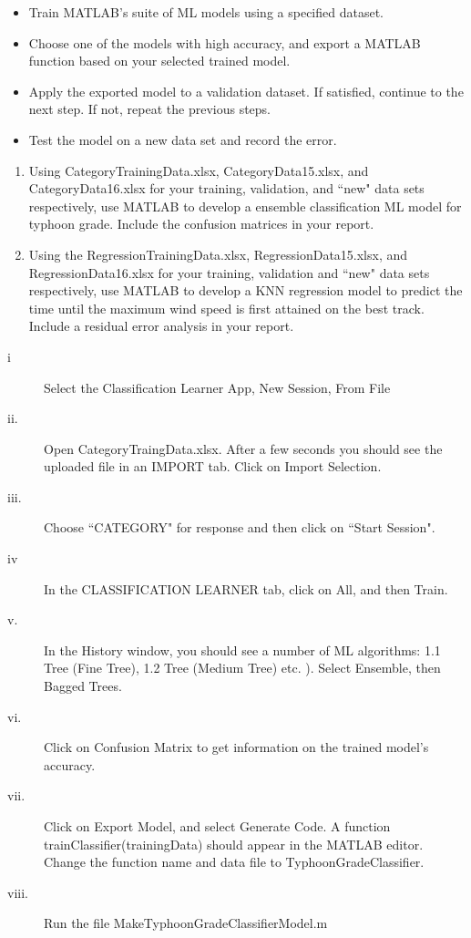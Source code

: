 \documentclass{SBCbookchapter}
\begin{document}
	\begin{itemize}
		\item Train MATLAB's suite of ML models using a specified dataset.
		\item Choose one of the models with high accuracy, and export a MATLAB function based on your selected trained model.
		\item Apply the exported model to a validation dataset.
		If satisfied, continue to the next step. If not, repeat the previous steps.
		\item Test the model on a new data set and record the error. 
	\end{itemize} 
	
	\begin{enumerate}
		\item Using CategoryTrainingData.xlsx,  CategoryData15.xlsx, and CategoryData16.xlsx for your training, validation, and ``new" data sets respectively, use MATLAB to develop a ensemble classification ML model for typhoon grade. Include the confusion matrices in your report. 
		
		\item Using the RegressionTrainingData.xlsx, RegressionData15.xlsx, and RegressionData16.xlsx for your training, validation and ``new" data sets respectively, use MATLAB to develop  a KNN regression model to predict the time until the maximum wind speed is first attained on the best track. Include a residual error analysis in your report.
	\end{enumerate}
	
	
	\begin{description}
		\item[i] Select the Classification Learner App, New Session, From File
		\item[ii.] Open CategoryTraingData.xlsx. After a few seconds you should see the uploaded file in an IMPORT tab.  Click on Import Selection.
		\item[iii.] Choose ``CATEGORY" for response and then click on ``Start Session".
		\item[iv] In the CLASSIFICATION LEARNER tab, click on All, and then Train.
		\item[v.] In the History window, you should see a number of ML algorithms: 1.1 Tree (Fine Tree), 1.2 Tree (Medium Tree) etc. ). Select Ensemble, then Bagged Trees.
		\item[vi.]  Click on Confusion Matrix to get information on the trained model's accuracy.
		\item[vii.] Click on Export Model, and select Generate Code.  A function trainClassifier(trainingData) should appear in the MATLAB editor.  Change the function name and data file to TyphoonGradeClassifier.
		\item[viii.] Run the file MakeTyphoonGradeClassifierModel.m
	\end{description}
	
\end{document}
